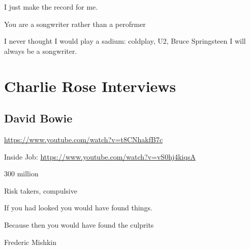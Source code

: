 \documentclass[]{book}
\theoremstyle{definition}
\theoremstyle{definition}
\theoremstyle{definition}
\theoremstyle{remark}
\begin{document}
I just make the record for me.

You are a songwriter rather than a perofrmer

I never thought I would play a sadium: coldplay, U2, Bruce Springsteen I
will always be a songwriter.

\section{Charlie Rose Interviews}\label{charlie-rose-interviews}

\subsection{David Bowie}\label{david-bowie}

\url{https://www.youtube.com/watch?v=t8CNhakfB7c}

Inside Job: \url{https://www.youtube.com/watch?v=vS0hj4kiqsA}

300 million

Risk takers, compulsive

If you had looked you would have found things.

Because then you would have found the culprits

Frederic Mishkin


\end{document}

